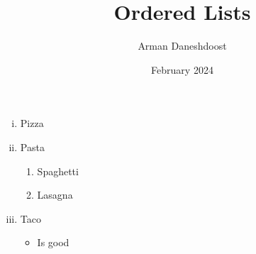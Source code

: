\documentclass{article}
\title{Ordered Lists}
\author{Arman Daneshdoost}
\date{February 2024}
\begin{document}
	\maketitle
	\begin{enumerate}[i)] %
		\item Pizza
		\item Pasta
		\begin{enumerate}
			\item Spaghetti
			\item Lasagna
		\end{enumerate}
		\item Taco
		\begin{itemize}
			\item Is good
		\end{itemize}
	\end{enumerate}
\end{document}
